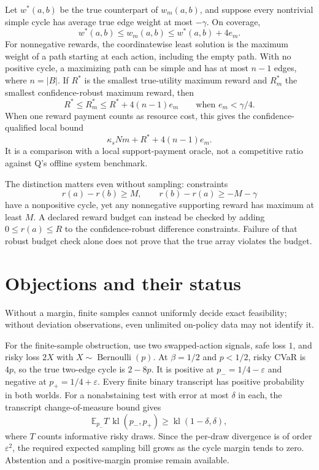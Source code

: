 \documentclass{article}
\begin{document}
Let \(w^*(a,b)\) be the true counterpart of \(w_m(a,b)\), and suppose every nontrivial simple cycle has average true edge weight at most \(-\gamma\). On coverage,
\[
w^*(a,b)\leq w_m(a,b)\leq w^*(a,b)+4e_m.
\]
For nonnegative rewards, the coordinatewise least solution is the maximum weight of a path starting at each action, including the empty path. With no positive cycle, a maximizing path can be simple and has at most \(n-1\) edges, where \(n=|B|\). If \(R^*\) is the smallest true-utility maximum reward and \(R_m^*\) the smallest confidence-robust maximum reward, then
\[
R^*\leq R_m^*
\leq R^*+4(n-1)e_m
\qquad\text{when }e_m<\gamma/4.
\]
When one reward payment counts as resource cost, this gives the confidence-qualified local bound
\[
\kappa_sNm+R^*+4(n-1)e_m.
\]
It is a comparison with a local support-payment oracle, not a competitive ratio against Q's offline system benchmark. 

The distinction matters even without sampling: constraints
\[
r(a)-r(b)\geq M,
\qquad
r(b)-r(a)\geq-M-\gamma
\]
have a nonpositive cycle, yet any nonnegative supporting reward has maximum at least \(M\). A declared reward budget can instead be checked by adding \(0\leq r(a)\leq R\) to the confidence-robust difference constraints. Failure of that robust budget check alone does not prove that the true array violates the budget. 

\section{Objections and their status}

\begin{objection}
Without a margin, finite samples cannot uniformly decide exact feasibility; without deviation observations, even unlimited on-policy data may not identify it.
\end{objection}

For the finite-sample obstruction, use two swapped-action signals, safe loss \(1\), and risky loss \(2X\) with \(X\sim\operatorname{Bernoulli}(p)\). At \(\beta=1/2\) and \(p<1/2\), risky CVaR is \(4p\), so the true two-edge cycle is \(2-8p\). It is positive at \(p_-=1/4-\varepsilon\) and negative at \(p_+=1/4+\varepsilon\). Every finite binary transcript has positive probability in both worlds. For a nonabstaining test with error at most \(\delta\) in each, the transcript change-of-measure bound gives
\[
\mathbb E_{p_-}T\,
\operatorname{kl}(p_-,p_+)
\geq
\operatorname{kl}(1-\delta,\delta),
\]
where \(T\) counts informative risky draws. Since the per-draw divergence is of order \(\varepsilon^2\), the required expected sampling bill grows as the cycle margin tends to zero. Abstention and a positive-margin promise remain available. 
\end{document}
